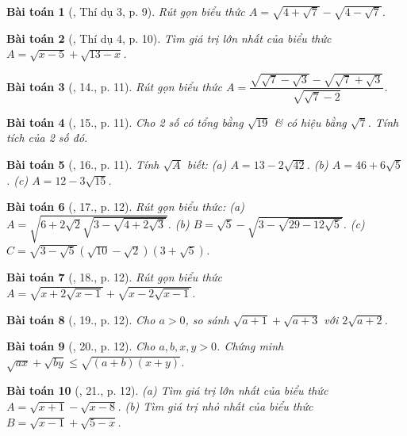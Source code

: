 \documentclass{article}
\newtheorem{baitoan}{Bài toán}
\begin{document}
\begin{baitoan}[\cite{Tuyen_Toan_9}, Thí dụ 3, p. 9]
	Rút gọn biểu thức $A = \sqrt{4 + \sqrt{7}} - \sqrt{4 - \sqrt{7}}$.
\end{baitoan}

\begin{baitoan}[\cite{Tuyen_Toan_9}, Thí dụ 4, p. 10]
	Tìm giá trị lớn nhất của biểu thức $A = \sqrt{x - 5} + \sqrt{13 - x}$.
\end{baitoan}

\begin{baitoan}[\cite{Tuyen_Toan_9}, 14., p. 11]
	Rút gọn biểu thức $A = \dfrac{\sqrt{\sqrt{7} - \sqrt{3}} - \sqrt{\sqrt{7} + \sqrt{3}}}{\sqrt{\sqrt{7} - 2}}$.
\end{baitoan}

\begin{baitoan}[\cite{Tuyen_Toan_9}, 15., p. 11]
	Cho 2 số có tổng bằng $\sqrt{19}$ \& có hiệu bằng $\sqrt{7}$. Tính tích của 2 số đó.
\end{baitoan}

\begin{baitoan}[\cite{Tuyen_Toan_9}, 16., p. 11]
	Tính $\sqrt{A}$ biết: (a) $A = 13 - 2\sqrt{42}$. (b) $A = 46 + 6\sqrt{5}$. (c) $A = 12 - 3\sqrt{15}$.
\end{baitoan}

\begin{baitoan}[\cite{Tuyen_Toan_9}, 17., p. 12]
	Rút gọn biểu thức: (a) $A = \sqrt{6 + 2\sqrt{2}\sqrt{3 - \sqrt{4 + 2\sqrt{3}}}}$. (b) $B = \sqrt{5} - \sqrt{3 - \sqrt{29 - 12\sqrt{5}}}$. (c) $C = \sqrt{3 - \sqrt{5}}(\sqrt{10} - \sqrt{2})(3 + \sqrt{5})$.
\end{baitoan}

\begin{baitoan}[\cite{Tuyen_Toan_9}, 18., p. 12]
	Rút gọn biểu thức $A = \sqrt{x + 2\sqrt{x - 1}} + \sqrt{x - 2\sqrt{x - 1}}$.
\end{baitoan}

\begin{baitoan}[\cite{Tuyen_Toan_9}, 19., p. 12]
	Cho $a > 0$, so sánh $\sqrt{a + 1} + \sqrt{a + 3}$ với $2\sqrt{a + 2}$.
\end{baitoan}

\begin{baitoan}[\cite{Tuyen_Toan_9}, 20., p. 12]
	Cho $a,b,x,y > 0$. Chứng minh $\sqrt{ax} + \sqrt{by}\le\sqrt{(a + b)(x + y)}$.
\end{baitoan}

\begin{baitoan}[\cite{Tuyen_Toan_9}, 21., p. 12]
	(a) Tìm giá trị lớn nhất của biểu thức $A = \sqrt{x + 1} - \sqrt{x - 8}$. (b) Tìm giá trị nhỏ nhất của biểu thức $B = \sqrt{x - 1} + \sqrt{5 - x}$.
\end{baitoan}
\end{document}
